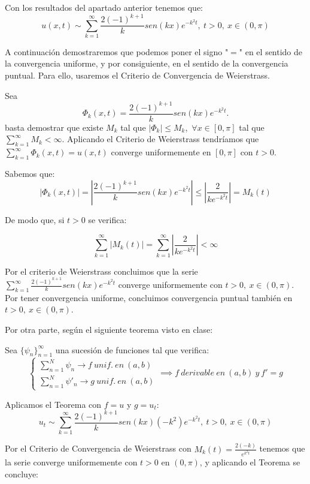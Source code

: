 \documentclass[bibnumbers, palatino]{apuntes}
\begin{document}
Con los resultados del apartado anterior tenemos que:
\begin{equation}
\label{eq3}
u(x,t) \sim  \sum^{\infty}_{k=1} \frac{2(-1)^{k+1}}{k} sen(kx)e^{-k^2t}, ~ t>0, ~ x\in(0,\pi)
\end{equation}

A continuación demostraremos que podemos poner el signo "$=$" en el sentido de la convergencia uniforme, y por consiguiente, en el sentido de la convergencia puntual. Para ello, usaremos el Criterio de Convergencia de Weierstrass. 

Sea $$\Phi_k(x,t) = \frac{2(-1)^{k+1}}{k} sen(kx)e^{-k^2t}. $$ basta demostrar que existe $M_k$ tal que \mbox{$|\Phi_k|\leq M_k$},~$\forall x\in[0,\pi]$ tal que $\sum^{\infty}_{k=1}M_k<\infty$. Aplicando el Criterio de Weierstrass tendríamos que $\sum^{\infty}_{k=1}\Phi_{k}(x,t) = u(x,t)$ converge uniformemente en $[0,\pi]$ con $t>0$.

Sabemos que:
$$|\Phi_k(x,t)| = |\frac{2(-1)^{k+1}}{k} sen(kx)e^{-k^2t}|\leq |\frac{2}{{k}e^{-k^2t}}| = M_k(t)$$

De modo que, si $t>0$ se verifica:

\[\sum_{k=1}^{\infty} |M_k(t)| = \sum_{k=1}^{\infty} |\frac{2}{{k}e^{-k^2t}}|<\infty\]

Por el criterio de Weierstrass concluimos que la serie $\sum^{\infty}_{k=1} \frac{2(-1)^{k+1}}{k} sen(kx)e^{-k^2t}$ converge uniformemente con $t>0, ~ x\in(0,\pi)$. Por tener convergencia uniforme, concluimos convergencia puntual también en $t>0, ~ x\in(0,\pi)$.

Por otra parte, según el siguiente teorema visto en clase:

\begin{theorem}
\label{teorema}
Sea $\{\psi_n\}_{n=1}^{\infty}$ una sucesión de funciones tal que verifica:
\[\begin{cases}\sum^{N}_{n=1}\psi_n\longrightarrow f ~unif. ~en ~(a,b)\\ \sum^{N}_{n=1}\psi'_n\longrightarrow g ~unif. ~en ~(a,b) \end{cases} \implies f~derivable~en~(a,b)~y~f'=g\]
\end{theorem}

Aplicamos el Teorema con $f = u$ y $g = u_t$:
$$u_t  \sim \sum^{\infty}_{k=1} \frac{2(-1)^{k+1}}{k} sen(kx)(-k^2)e^{-k^2t}, ~ t>0, ~ x\in(0,\pi)$$

Por el Criterio de Convergencia de Weierstrass  con $M_k(t) = \frac{2(-k)}{e^{k^2t}}$ tenemos que la serie converge uniformemente con $t>0$ en $(0,\pi)$, y aplicando el Teorema se concluye:
\end{document}
